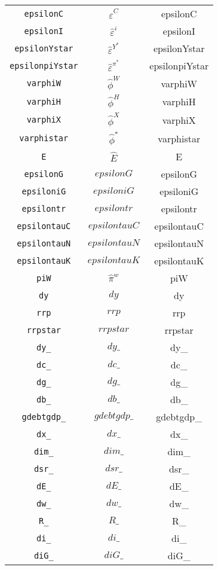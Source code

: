 \begin{center}
\begin{longtable}{ccc}
\texttt{epsilonC} & $\hat{\varepsilon}^C$ & epsilonC\\
\texttt{epsilonI} & $\hat{\varepsilon}^i$ & epsilonI\\
\texttt{epsilonYstar} & $\hat{\varepsilon}^{Y^*}$ & epsilonYstar\\
\texttt{epsilonpiYstar} & $\hat{\varepsilon}^{\pi^*}$ & epsilonpiYstar\\
\texttt{varphiW} & $\hat{\phi}^W$ & varphiW\\
\texttt{varphiH} & $\hat{\phi}^H$ & varphiH\\
\texttt{varphiX} & $\hat{\phi}^X$ & varphiX\\
\texttt{varphistar} & $\hat{\phi}^*$ & varphistar\\
\texttt{E} & $\hat{E}$ & E\\
\texttt{epsilonG} & $epsilonG$ & epsilonG\\
\texttt{epsiloniG} & $epsiloniG$ & epsiloniG\\
\texttt{epsilontr} & $epsilontr$ & epsilontr\\
\texttt{epsilontauC} & $epsilontauC$ & epsilontauC\\
\texttt{epsilontauN} & $epsilontauN$ & epsilontauN\\
\texttt{epsilontauK} & $epsilontauK$ & epsilontauK\\
\texttt{piW} & $\hat{\pi}^w$ & piW\\
\texttt{dy} & $dy$ & dy\\
\texttt{rrp} & $rrp$ & rrp\\
\texttt{rrpstar} & $rrpstar$ & rrpstar\\
\texttt{dy\_} & $dy\_$ & dy\_\\
\texttt{dc\_} & $dc\_$ & dc\_\\
\texttt{dg\_} & $dg\_$ & dg\_\\
\texttt{db\_} & $db\_$ & db\_\\
\texttt{gdebtgdp\_} & $gdebtgdp\_$ & gdebtgdp\_\\
\texttt{dx\_} & $dx\_$ & dx\_\\
\texttt{dim\_} & $dim\_$ & dim\_\\
\texttt{dsr\_} & $dsr\_$ & dsr\_\\
\texttt{dE\_} & $dE\_$ & dE\_\\
\texttt{dw\_} & $dw\_$ & dw\_\\
\texttt{R\_} & $R\_$ & R\_\\
\texttt{di\_} & $di\_$ & di\_\\
\texttt{diG\_} & $diG\_$ & diG\_\\

\end{longtable}
\end{center}
